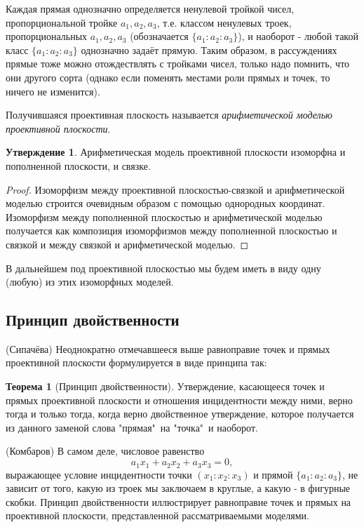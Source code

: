 \documentclass[a4paper, 12pt]{article}
\theoremstyle{definition}
\newtheorem*{theorem}{Теорема}
\newtheorem*{subtheorem}{Утверждение}
\begin{document}
Каждая прямая однозначно определяется ненулевой тройкой чисел, пропорциональной тройке $a_1, a_2, a_3$, т.е. классом ненулевых троек, пропорциональных $a_1, a_2, a_3$ (обозначается $\{a_1:a_2:a_3\}$), и наоборот - любой такой класс $\{a_1:a_2:a_3\}$ однозначно задаёт прямую. Таким образом, в рассуждениях прямые тоже можно отождествлять с тройками чисел, только надо помнить, что они другого сорта (однако если поменять местами роли прямых и точек, то ничего не изменится).

Получившаяся проективная плоскость называется \textit{арифметической моделью проективной плоскости}.

\begin{subtheorem}
    Арифметическая модель проективной плоскости изоморфна и пополненной плоскости, и связке.
\end{subtheorem}
\begin{proof}
    Изоморфизм между проективной плоскостью-связкой и арифметической моделью строится очевидным образом с помощью однородных координат. Изоморфизм между пополненной плоскостью и арифметической моделью получается как композиция изоморфизмов между пополненной плоскостью и связкой и между связкой и арифметической моделью.
\end{proof}

В дальнейшем под проективной плоскостью мы будем иметь в виду одну (любую) из этих изоморфных моделей.


\subsection{Принцип двойственности}
(Сипачёва) Неоднократно отмечавшееся выше равноправие точек и прямых проективной плоскости формулируется в виде принципа так:

\begin{theorem}[Принцип двойственности]
    Утверждение, касающееся точек и прямых проективной плоскости и отношения инцидентности между ними, верно тогда и только тогда, когда верно двойственное утверждение, которое получается из данного заменой слова "прямая"\ на "точка"\ и наоборот.
\end{theorem}

(Комбаров) В самом деле, числовое равенство \[ a_1x_1 + a_2x_2 + a_3x_3 = 0, \] выражающее условие инцидентности точки $(x_1:x_2:x_3)$ и прямой $\{a_1:a_2:a_3\}$, не зависит от того, какую из троек мы заключаем в круглые, а какую - в фигурные скобки. Принцип двойственности иллюстрирует равноправие точек и прямых на проективной плоскости, представленной рассматриваемыми моделями.
\end{document}
